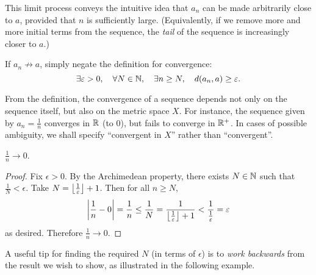 \begin{remark}
This limit process conveys the intuitive idea that $a_n$ can be made arbitrarily close to $a$, provided that $n$ is sufficiently large. 
(Equivalently, if we remove more and more initial terms from the sequence, the \emph{tail} of the sequence is increasingly closer to $a$.)
\end{remark}

\begin{remark}
If $a_n\not\to a$, simply negate the definition for convergence:
\[\exists\varepsilon>0,\quad\forall N\in\mathbb N,\quad\exists n\ge N,\quad d(a_n,a)\ge\varepsilon.\]
\end{remark}

\begin{remark}
From the definition, the convergence of a sequence depends not only on the sequence itself, but also on the metric space $X$. For instance, the sequence given by $a_n=\frac{1}{n}$ converges in $\mathbb R$ (to $0$), but fails to converge in $\mathbb R^+$. In cases of possible ambiguity, we shall specify ``convergent in $X$'' rather than ``convergent''. 
\end{remark}

\begin{example}
$\frac{1}{n}\to 0$.
\begin{proof}
Fix $\epsilon>0$. By the Archimedean property, there exists $N\in\mathbb N$ such that $\frac{1}{N}<\epsilon$. Take $N=\left\lfloor \frac{1}{\varepsilon} \right\rfloor+1$. Then for all $n\ge N$,
\[\left|\frac{1}{n}-0\right|=\frac{1}{n}\le\frac{1}{N}=\frac{1}{\left\lfloor \frac{1}{\varepsilon} \right\rfloor+1}<\frac{1}{\frac{1}{\varepsilon}}=\varepsilon\]
as desired. Therefore $\frac{1}{n}\to0$.
\end{proof}
\end{example}

A useful tip for finding the required $N$ (in terms of $\epsilon$) is to \emph{work backwards} from the result we wish to show, as illustrated in the following example.

